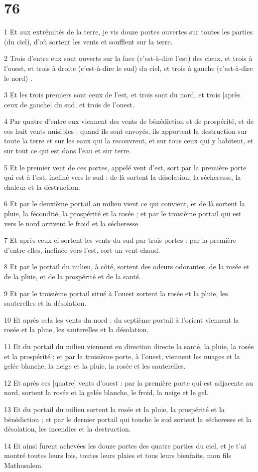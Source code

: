 \chapter{76}

\par 1 Et aux extrémités de la terre, je vis douze portes ouvertes sur toutes les parties (du ciel), d'où sortent les vents et soufflent sur la terre.
\par 2 Trois d'entre eux sont ouverts sur la face (c'est-à-dire l'est) des cieux, et trois à l'ouest, et trois à droite (c'est-à-dire le sud) du ciel, et trois à gauche (c'est-à-dire le nord) .
\par 3 Et les trois premiers sont ceux de l'est, et trois sont du nord, et trois [après ceux de gauche] du sud, et trois de l'ouest.
\par 4 Par quatre d'entre eux viennent des vents de bénédiction et de prospérité, et de ces huit vents nuisibles : quand ils sont envoyés, ils apportent la destruction sur toute la terre et sur les eaux qui la recouvrent, et sur tous ceux qui y habitent, et sur tout ce qui est dans l'eau et sur terre.
\par 5 Et le premier vent de ces portes, appelé vent d'est, sort par la première porte qui est à l'est, incliné vers le sud : de là sortent la désolation, la sécheresse, la chaleur et la destruction.
\par 6 Et par le deuxième portail au milieu vient ce qui convient, et de là sortent la pluie, la fécondité, la prospérité et la rosée ; et par le troisième portail qui est vers le nord arrivent le froid et la sécheresse.
\par 7 Et après ceux-ci sortent les vents du sud par trois portes : par la première d'entre elles, inclinée vers l'est, sort un vent chaud.
\par 8 Et par le portail du milieu, à côté, sortent des odeurs odorantes, de la rosée et de la pluie, et de la prospérité et de la santé.
\par 9 Et par le troisième portail situé à l'ouest sortent la rosée et la pluie, les sauterelles et la désolation.
\par 10 Et après cela les vents du nord : du septième portail à l'orient viennent la rosée et la pluie, les sauterelles et la désolation.
\par 11 Et du portail du milieu viennent en direction directe la santé, la pluie, la rosée et la prospérité ; et par la troisième porte, à l'ouest, viennent les nuages ​​et la gelée blanche, la neige et la pluie, la rosée et les sauterelles.
\par 12 Et après ces [quatre] vents d'ouest : par la première porte qui est adjacente au nord, sortent la rosée et la gelée blanche, le froid, la neige et le gel.
\par 13 Et du portail du milieu sortent la rosée et la pluie, la prospérité et la bénédiction ; et par le dernier portail qui touche le sud sortent la sécheresse et la désolation, les incendies et la destruction.
\par 14 Et ainsi furent achevées les douze portes des quatre parties du ciel, et je t'ai montré toutes leurs lois, toutes leurs plaies et tous leurs bienfaits, mon fils Mathusalem.

